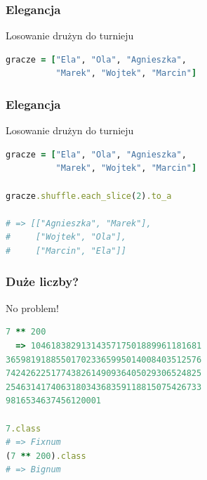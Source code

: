 \begin{frame}[fragile]
\frametitle{Elegancja}
\begin{block}{Losowanie drużyn do turnieju}
\begin{lstlisting}[language=Ruby]
gracze = ["Ela", "Ola", "Agnieszka",
          "Marek", "Wojtek", "Marcin"]
\end{lstlisting}
\end{block}
\end{frame}
\begin{frame}[fragile]
\frametitle{Elegancja}
\begin{block}{Losowanie drużyn do turnieju}
\begin{lstlisting}[language=Ruby]
gracze = ["Ela", "Ola", "Agnieszka",
          "Marek", "Wojtek", "Marcin"]

gracze.shuffle.each_slice(2).to_a

# => [["Agnieszka", "Marek"],
#     ["Wojtek", "Ola"],
#     ["Marcin", "Ela"]]
\end{lstlisting}
\end{block}
\end{frame}


\begin{frame}[fragile]
\frametitle{Duże liczby?}
\begin{block}{No problem!}
\begin{lstlisting}[language=Ruby]
7 ** 200
  => 1046183829131435717501889961181681
365981918855017023365995014008403512576
742426225177438261490936405029306524825
254631417406318034368359118815075426733
9816534637456120001

7.class
# => Fixnum
(7 ** 200).class
# => Bignum
\end{lstlisting}
\end{block}
\end{frame}



